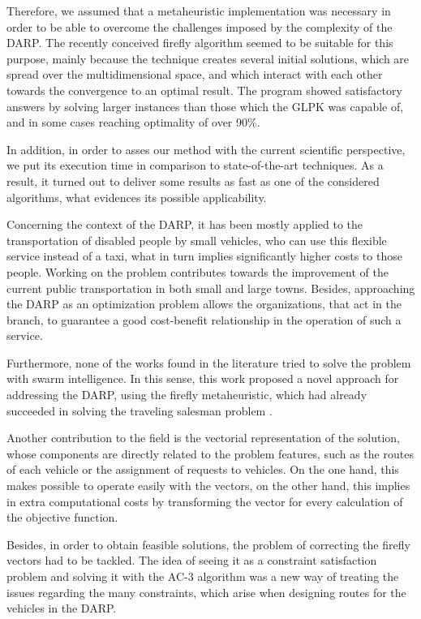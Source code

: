 \documentclass[tuberlin,cic,tc,openright,english,noabntcite,oneside]{iiufrgs}
\begin{document}
Therefore, we assumed that a metaheuristic implementation was necessary in order to be able to overcome the challenges imposed by the complexity of the DARP. The recently conceived firefly algorithm seemed to be suitable for this purpose, mainly because the technique creates several initial solutions, which are spread over the multidimensional space, and which interact with each other towards the convergence to an optimal result. The program showed satisfactory answers by solving larger instances than those which the GLPK was capable of, and in some cases reaching optimality of over 90\%.

In addition, in order to asses our method with the current scientific perspective, we put its execution time in comparison to state-of-the-art techniques. As a result, it turned out to deliver some results as fast as one of the considered algorithms, what evidences its possible applicability.

Concerning the context of the DARP, it has been mostly applied to the transportation of disabled people by small vehicles, who can use this flexible service instead of a taxi, what in turn implies significantly higher costs to those people. Working on the problem contributes towards the improvement of the current public transportation in both small and large towns. Besides, approaching the DARP as an optimization problem allows the organizations, that act in the branch, to guarantee a good cost-benefit relationship in the operation of such a service.

Furthermore, none of the works found in the literature tried to solve the problem with swarm intelligence. In this sense, this work proposed a novel approach for addressing the DARP, using the firefly metaheuristic, which had already succeeded in solving the traveling salesman problem \parencite{jati_evolutionary_2011}.

Another contribution to the field is the vectorial representation of the solution, whose components are directly related to the problem features, such as the routes of each vehicle or the assignment of requests to vehicles. On the one hand, this makes possible to operate easily with the vectors, on the other hand, this implies in extra computational costs by transforming the vector for every calculation of the objective function.

Besides, in order to obtain feasible solutions, the problem of correcting the firefly vectors had to be tackled. The idea of seeing it as a constraint satisfaction problem and solving it with the AC-3 algorithm was a new way of treating the issues regarding the many constraints, which arise when designing routes for the vehicles in the DARP.
\end{document}
